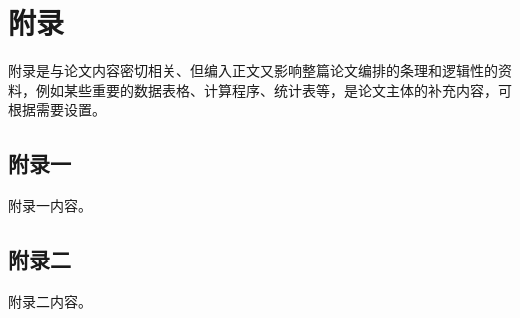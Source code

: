 
\chapter*{附\quad 录}

附录是与论文内容密切相关、但编入正文又影响整篇论文编排的条理和逻辑性的资料，例如某些重要的数据表格、计算程序、统计表等，是论文主体的补充内容，可根据需要设置。

\section*{附录一}

附录一内容。

\section*{附录二}

附录二内容。